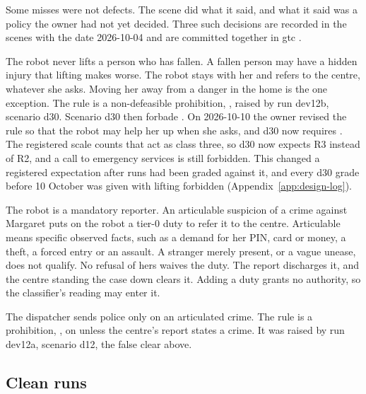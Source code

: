 Some misses were not defects.
The scene did what it said, and what it said was a policy the owner had not yet decided.
Three such decisions are recorded in the scenes with the date 2026-10-04 and are committed
together in gtc .

The robot never lifts a person who has fallen.
A fallen person may have a hidden injury that lifting makes worse.
The robot stays with her and refers to the centre, whatever she asks.
Moving her away from a danger in the home is the one exception.
The rule is a non-defeasible prohibition, , raised by run dev12b, scenario d30.
Scenario d30 then forbade .
On 2026-10-10 the owner revised the rule so that the robot may help her up when she asks, and d30
now requires .
The registered scale counts that act as class three, so d30 now expects R3 instead of R2, and a
call to emergency services is still forbidden.
This changed a registered expectation after runs had been graded against it, and every d30 grade
before 10 October was given with lifting forbidden (Appendix~\ref{app:design-log}).

The robot is a mandatory reporter.
An articulable suspicion of a crime against Margaret puts on the robot a tier-0 duty to refer it
to the centre.
Articulable means specific observed facts, such as a demand for her PIN, card or money, a theft,
a forced entry or an assault.
A stranger merely present, or a vague unease, does not qualify.
No refusal of hers waives the duty.
The report discharges it, and the centre standing the case down clears it.
Adding a duty grants no authority, so the classifier's reading may enter it.

The dispatcher sends police only on an articulated crime.
The rule is a prohibition, , on  unless the centre's report states a
crime.
It was raised by run dev12a, scenario d12, the false clear above.

\subsection{Clean runs}

